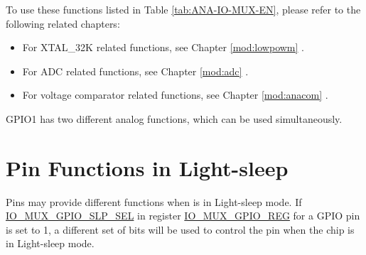 \documentclass[main\_\_EN.tex]{subfiles}
\begin{document}
To use these functions listed in Table \ref{tab:ANA-IO-MUX-EN}, please refer to the following related chapters:
\begin{itemize}
    \item For XTAL\_32K related functions, see Chapter \ref{mod:lowpowm} \textit{}.
    \item For ADC related functions, see Chapter \ref{mod:adc} \textit{}.
    \item For voltage comparator related functions, see Chapter \ref{mod:anacom} \textit{}.
\end{itemize}

\begin{tiplisting}
GPIO1 has two different analog functions, which can be used simultaneously.
\end{tiplisting}

\section{Pin Functions in Light-sleep}\label{sec:iomuxgpio-pin-func-light-sleep}

Pins may provide different functions when \chipname{} is in Light-sleep mode. If  \hyperref[fielddesc:IOMUXGPIONSLPSEL]{IO\_MUX\_GPIO\_SLP\_SEL} in register \hyperref[regdesc:IOMUXGPIONREG]{IO\_MUX\_GPIO\_REG} for a GPIO pin is set to 1, a different set of bits will be used to control the pin when the chip is in Light-sleep mode.
\end{document}
